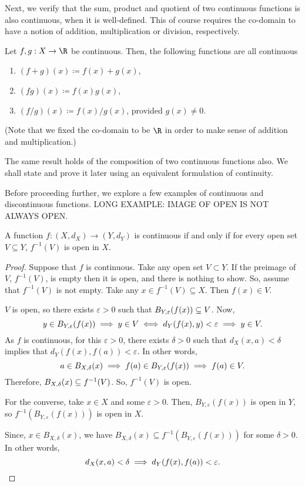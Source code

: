 Next, we verify that the sum, product and quotient of two continuous functions is also continuous, when it is well-defined. This of course requires the co-domain to have a notion of addition, multiplication or division, respectively.
\begin{nlemma}
  Let $f,g:X \to \R$ be continuous. Then, the following functions are all continuous
  \begin{enumerate}
  \item $(f+g)(x) \coloneq f(x) + g(x)$,
  \item $(fg)(x) \coloneq f(x)g(x)$,
  \item $(f/g)(x) \coloneq f(x)/g(x)$, provided $g(x) \neq 0$.
  \end{enumerate}
\end{nlemma}
(Note that we fixed the co-domain to be $\R$ in order to make sense of addition and multiplication.)

The same result holds of the composition of two continuous functions also. We shall state and prove it later using an equivalent formulation of continuity.

Before proceeding further, we explore a few examples of continuous and discontinuous functions. LONG EXAMPLE: IMAGE OF OPEN IS NOT ALWAYS OPEN.

\begin{nthm}
  A function $f:(X, d_X) \to (Y, d_Y)$ is continuous if and only if for every open set $V \subseteq Y$, $f^{-1}(V)$ is open in $X$.
\end{nthm}
\begin{proof}
  Suppose that $f$ is continuous. Take any open set $V \subset Y$. If the preimage of $V$, $f^{-1}(V)$, is empty then it is open, and there is nothing to show. So, assume that $f^{-1}(V)$ is not empty. Take any $x \in f^{-1}(V) \subseteq X$. Then $f(x) \in V$.

  $V$ is open, so there exists $\varepsilon > 0$ such that $B_{Y,\varepsilon}(f(x)) \subseteq V$. Now,
  \begin{equation*}
    y \in B_{Y,\varepsilon}(f(x)) \implies y \in V
    \iff d_{Y}(f(x),y) < \varepsilon \implies y \in V.
  \end{equation*}
  As $f$ is continuous, for this $\varepsilon>0$, there exists $\delta>0$ such that $d_{X}(x,a) < \delta$ implies that $d_{Y}(f(x),f(a))<\varepsilon$. In other words,
  \begin{equation*}
    a \in B_{X,\delta}(x) \implies f(a) \in B_{Y,\varepsilon}(f(x)) \implies f(a) \in V.
  \end{equation*}
  Therefore, $B_{X,\delta}(x) \subseteq f^{-1}(V)$. So, $f^{-1}(V)$ is open.

  For the converse, take $x \in X$ and some $\varepsilon>0$. Then, $B_{Y, \varepsilon}(f(x))$ is open in $Y$, so $f^{-1}(B_{Y, \varepsilon}(f(x)))$ is open in $X$.

  Since, $x \in B_{X,\delta}(x)$, we have $B_{X,\delta}(x) \subseteq f^{-1}(B_{Y, \varepsilon}(f(x)))$ for some $\delta>0$. In other words,
  \begin{equation*}
    d_{X}(x,a) < \delta \implies d_{Y}(f(x), f(a)) < \varepsilon.\qedhere
  \end{equation*}
\end{proof}

